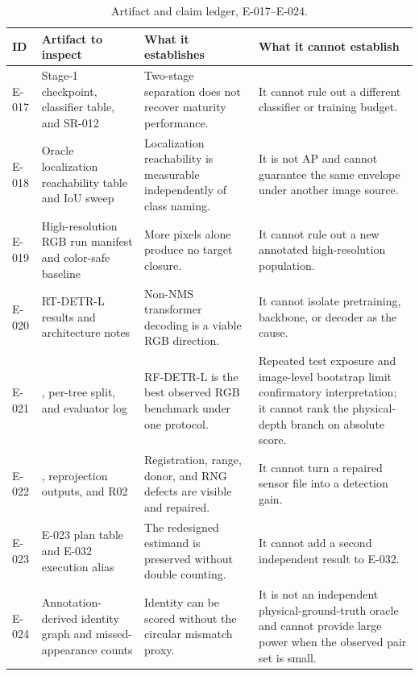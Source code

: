 \begin{table}[t]
\centering\footnotesize
\caption{Artifact and claim ledger, E-017--E-024.}
\begin{tabularx}{\textwidth}{L{0.07\textwidth}L{0.29\textwidth}Y Y}
\toprule
\textbf{ID} & \textbf{Artifact to inspect} & \textbf{What it establishes} & \textbf{What it cannot establish}\\
\midrule
E-017 & Stage-1 checkpoint, classifier table, and SR-012 & Two-stage separation does not recover maturity performance. & It cannot rule out a different classifier or training budget.\\
E-018 & Oracle localization reachability table and IoU sweep & Localization reachability is measurable independently of class naming. & It is not AP and cannot guarantee the same envelope under another image source.\\
E-019 & High-resolution RGB run manifest and color-safe baseline & More pixels alone produce no target closure. & It cannot rule out a new annotated high-resolution population.\\
E-020 & RT-DETR-L results and architecture notes & Non-NMS transformer decoding is a viable RGB direction. & It cannot isolate pretraining, backbone, or decoder as the cause.\\
E-021 & , per-tree split, and evaluator log & RF-DETR-L is the best observed RGB benchmark under one protocol. & Repeated test exposure and image-level bootstrap limit confirmatory interpretation; it cannot rank the physical-depth branch on absolute score.\\
E-022 & , reprojection outputs, and R02 & Registration, range, donor, and RNG defects are visible and repaired. & It cannot turn a repaired sensor file into a detection gain.\\
E-023 & E-023 plan table and E-032 execution alias & The redesigned estimand is preserved without double counting. & It cannot add a second independent result to E-032.\\
E-024 & Annotation-derived identity graph and missed-appearance counts & Identity can be scored without the circular mismatch proxy. & It is not an independent physical-ground-truth oracle and cannot provide large power when the observed pair set is small.\\
\bottomrule
\end{tabularx}
\end{table}

